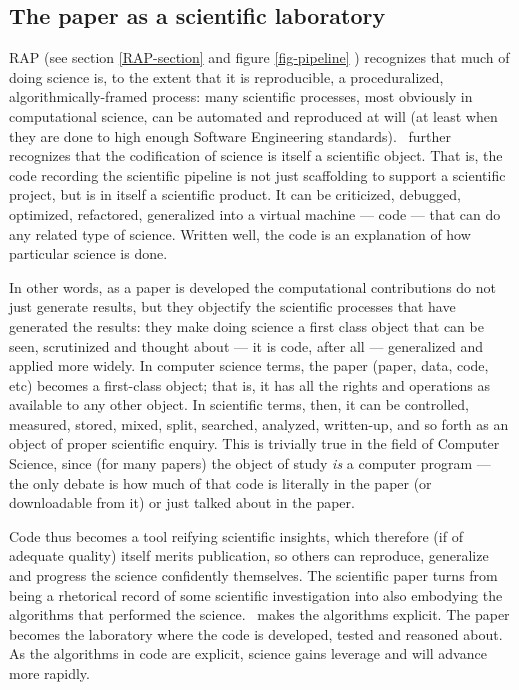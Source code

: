 \documentclass{comjnl}
\begin{document}
\begin{change}
\subsection{The paper as a scientific laboratory}
RAP (see section \ref{RAP-section} and figure \ref{fig-pipeline} ) recognizes that much of doing science is, to the extent that it is reproducible, a proceduralized, algorithmically-framed process: many scientific processes, most obviously in computational science, can be automated and reproduced at will (at least when they are done to high enough Software Engineering standards). \RAPstar\ further recognizes that the codification of science is itself a scientific object. That is, the code recording the scientific pipeline is not just scaffolding to support a scientific project, but is in itself a scientific product. It can be criticized, debugged, optimized, refactored, generalized into a virtual machine --- code --- that can do any related type of science. Written well, the code is an explanation of how particular science is done. 

In other words, as a paper is developed the computational contributions do not just generate results, but they objectify the scientific processes that have generated the results: they make doing science a first class object that can be seen, scrutinized and thought about --- it is code, after all --- generalized and applied more widely. In computer science terms, the paper (paper, data, code, etc) becomes a first-class object; that is, it has all the rights and operations as available to any other object. In scientific terms, then, it can be controlled, measured, stored, mixed, split, searched, analyzed, written-up, and so forth as an object of proper scientific enquiry. This is trivially true in the field of Computer Science, since (for many papers) the object of study \emph{is\/} a computer program --- the only debate is how much of that code is literally in the paper (or downloadable from it) or just talked about in the paper.

Code thus becomes a tool reifying scientific insights, which therefore (if of adequate quality) itself merits publication, so others can reproduce, generalize and progress the science confidently themselves. The scientific paper turns from being a rhetorical record of some scientific investigation into also embodying the algorithms that performed the science. \RAPstar\ makes the algorithms explicit. The paper becomes the laboratory where the code is developed, tested and reasoned about. As the algorithms in code are explicit, science gains leverage and will advance more rapidly.


\end{change}
\end{document}
